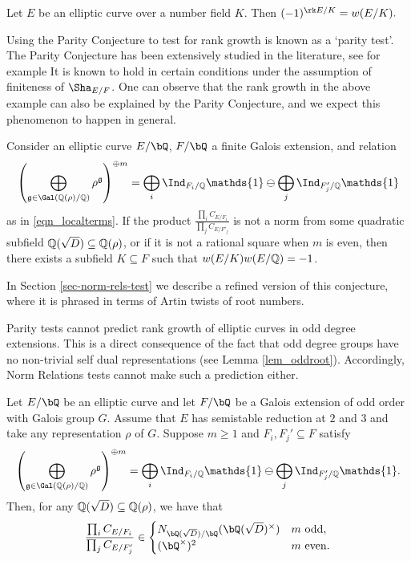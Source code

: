 \begin{conj}\label{conj_parity}
    Let $E$ be an elliptic curve over a number field $K$. Then
    $(-1)^{\rk E / K} = w(E / K).$
\end{conj}

Using the Parity Conjecture to test for rank growth is known as a `parity test'. The Parity Conjecture has been extensively studied in the literature, see for example \cite{Tim} It is known to hold in certain conditions under the assumption of finiteness of $\Sha_{E/F}$. One can observe that the rank growth in the above example can also be explained by the Parity Conjecture, and we expect this phenomenon to happen in general. 

\begin{conj}\label{conj_normroot}
    Consider an elliptic curve $E / \bQ$, $F / \bQ$ a finite Galois extension, and relation 
    $$\left(\bigoplus_{\mathfrak{g}\in\Gal(\QQ(\rho)/\QQ)}\rho^{\mathfrak{g}}\right)^{\oplus m}=\bigoplus_i\Ind_{F_i/\QQ}\mathds{1}\ominus\bigoplus_j\Ind_{F'_j/\QQ}\mathds{1}$$
    as in \eqref{eqn_localterms}. If the product $\frac{\prod_i C_{E/F_i}}{\prod_j C_{E/F'_j}}$ is not a norm from some quadratic subfield $\mathbb{Q}(\sqrt{D})\subseteq\mathbb{Q}(\rho)$, or if it is not a rational square when $m$ is even, then there exists a subfield $K\subseteq F$ such that $w(E/K)w(E/\mathbb{Q})=-1$. 
\end{conj}

In Section \ref{sec-norm-rels-test} we describe a refined version of this conjecture, where it is phrased in terms of Artin twists of root numbers.

Parity tests cannot predict rank growth of elliptic curves in odd degree extensions. This is a direct consequence of the fact that odd degree groups have no non-trivial self dual representations (see Lemma \ref{lem_oddroot}). Accordingly, Norm Relations tests cannot make such a prediction either.

\begin{thm}\label{thm_odd-cons}
    Let $E / \bQ$ be an elliptic curve and let $F / \bQ$ be a Galois extension of odd order with Galois group $G$. Assume that $E$ has semistable reduction at $2$ and $3$ and take any representation $\rho$ of $G$. Suppose $m\geq 1$ and $F_i,F_j'\subseteq F$ satisfy 
    \begin{equation*}%
        \left(\bigoplus_{\mathfrak{g}\in\Gal(\QQ(\rho)/\QQ)}\rho^{\mathfrak{g}}\right)^{\oplus m }=\bigoplus_i\Ind_{F_i/\QQ}\mathds{1}\ominus\bigoplus_j\Ind_{F'_j/\QQ}\mathds{1}.
    \end{equation*}
    Then, for any $\mathbb{Q}(\sqrt{D})\subseteq\mathbb{Q}(\rho)$, we have that
    \[ \frac{\prod_i C_{E/F_i}}{\prod_j C_{E/F_j'}}  \in 
       \begin{cases}
           N_{\bQ(\sqrt{D}) / \bQ}(\bQ(\sqrt{D})^{\times}) & m \ \text{odd}, \\
           (\bQ^{\times})^2 & m \ \text{even}.
       \end{cases} 
    \] 
\end{thm}


